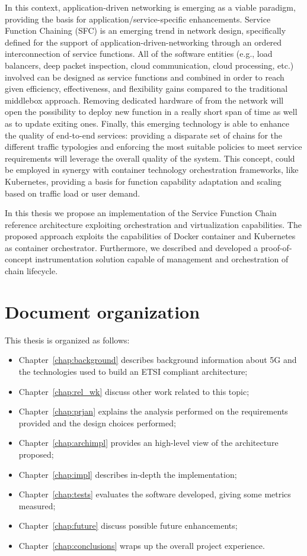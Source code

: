 In this context, application-driven networking is emerging as a viable
paradigm, providing the basis for application/service-specific enhancements. 
Service Function Chaining (SFC) is an emerging trend  in network design,
specifically defined for the support of application-driven-networking through an
ordered interconnection of service functions. All of the software entities
(e.g., load balancers, deep packet inspection, cloud communication, cloud
processing, etc.) involved can be designed as service functions and combined in
order to reach given efficiency, effectiveness, and flexibility gains compared
to the traditional middlebox approach. Removing dedicated hardware of from the
network will open the possibility to deploy new function in a really short span
of time as well as to update exiting ones. Finally, this emerging technology is
able to enhance the quality of end-to-end services: providing a disparate set of
chains for the different traffic typologies and enforcing the most suitable
policies to meet service requirements will leverage the overall quality of the
system. This concept, could be employed in synergy with container technology
orchestration frameworks, like Kubernetes, providing a basis for function
capability adaptation and scaling based on traffic load or
user demand.

In this thesis we propose an implementation of the Service Function Chain
reference architecture exploiting orchestration and virtualization capabilities.
The proposed approach exploits the capabilities of Docker container and
Kubernetes as container orchestrator. Furthermore, we described and developed a
proof-of-concept instrumentation solution capable of management and
orchestration of chain lifecycle.

\section*{Document organization}

This thesis is organized as follows:
\begin{itemize}
  \item Chapter~\ref{chap:background} describes background information about 5G 
and the technologies used to build an ETSI compliant architecture;
  \item Chapter~\ref{chap:rel_wk} discuss other work related to this topic;
  \item Chapter~\ref{chap:prjan} explains the analysis performed on the 
requirements provided and the design choices performed;
  \item Chapter~\ref{chap:archimpl} provides an high-level view of
  the architecture proposed;
  \item Chapter~\ref{chap:impl} describes in-depth the implementation;
  \item Chapter~\ref{chap:tests} evaluates the software developed, giving some
  metrics measured;
  \item Chapter~\ref{chap:future} discuss possible future enhancements;
  \item Chapter~\ref{chap:conclusions} wraps up the overall project experience.
\end{itemize}